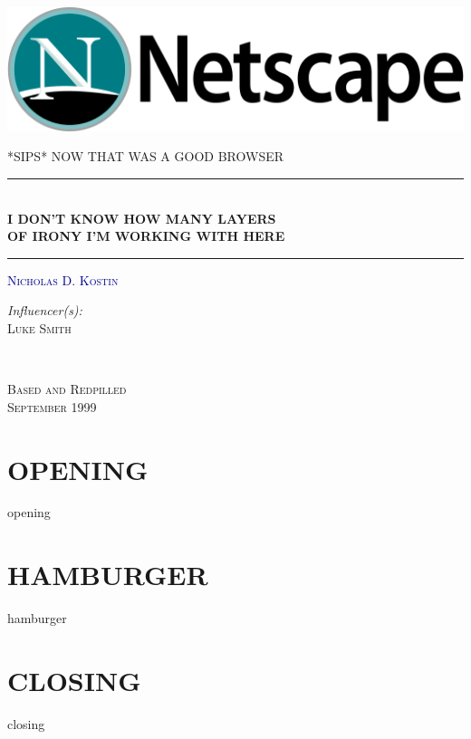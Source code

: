 \documentclass[twoside]{report}
\numberwithin{equation}{section}
\begin{document}
\begin{titlepage}

\centering

\includegraphics[width=\textwidth]{images/netscapenavigator.png}

\vspace{2.0em}

\textsc{\large {*SIPS* NOW THAT WAS A GOOD BROWSER}}

\vspace{1.0em}

\rule{\textwidth}{1pt}\\[0.2em]
{\huge {\textbf{I DON'T KNOW HOW MANY LAYERS \\[0.2cm] OF IRONY I'M WORKING WITH HERE}}}\\[0.2em]
\rule{\textwidth}{1pt}

\vspace{2.0em}

\textsc{\huge \textcolor{DARKBLUE}{\textsc{Nicholas D. Kostin}}}

\vspace{2.6em}

\begin{minipage}{0.4\textwidth}
\begin{flushleft} \large
\emph{Influencer(s):} \\
\textsc{Luke Smith} \\
\end{flushleft}
\end{minipage}
~
\begin{minipage}{0.4\textwidth}
\begin{flushright} \large
\textsc{Based and Redpilled} \\
\textsc{September 1999}
\end{flushright}
\end{minipage}

\vfill

\end{titlepage}

\newpage

\tableofcontents

\chapter{OPENING}
\newpage
{opening}

\newpage

\chapter{HAMBURGER}
\newpage
{hamburger}

\newpage

\chapter{CLOSING}
\newpage
{closing}
\end{document}
